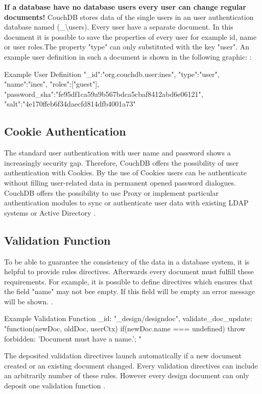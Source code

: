 \textbf{If a database have no database users every user can change regular documents!}
CouchDB stores data of the single users in an user authentication database named (\_\textbackslash users). Every user have a separate document. In this document it is possible to save the properties of every user for example id, name or user roles.The property "type" can only substituted with the key "user". An example user definition in such a document is shown in the following graphic: \cite{ApacheSoftwareFoundation.2013.SecurityFeatures}:
\begin{mylisting}{Example User Definition \cite{ApacheSoftwareFoundation.2013.SecurityFeatures}}
{
 "\_id":"org.couchdb.user:ines",
 "type":"user",
 "name":"ines",
 "roles":["guest"],
 "password\_sha":"fe95df1ca59a9b567bdca5cbaf8412abd6e06121",
 "salt":"4e170ffeb6f34daecfd814dfb4001a73"
}
\end{mylisting} 

\subsection{Cookie Authentication}
The standard user authentication with user name and password shows a increasingly security gap. Therefore, CouchDB offers the possibility of user authentication with Cookies. By the use of Cookies users can be authenticate without filling user-related data in permanent opened password dialogues. 
CouchDB offers the possibility to use Proxy or implement particular authentication modules to sync or authenticate user data with existing LDAP systems or Active Directory \cite{Anderson.2010.Buch}.

\subsection{Validation Function}
To be able to guarantee the consistency of the data in a database system, it is helpful to provide rules directives. Afterwards every document must fulfill these requirements. For example, it is possible to define directives which ensures that the field "name" may not bee empty. If this field will be empty an error message will be shown. \cite{Scheliga.2010}.

\begin{mylisting}{Example Validation Function \cite{Scheliga.2010}}
{
    \_id: "\_design/designdoc",
    validate\_doc\_update: "function(newDoc, oldDoc, userCtx) {
    if(newDoc.name === undefined) {
    throw {forbidden: 'Document must have a name.'};
    }}"
}
\end{mylisting}

The deposited validation directives launch automatically if a new document created or an existing document changed. Every validation directives can include an arbitrarily number of these rules. However every design document can only deposit one validation function \cite{Scheliga.2010}.


